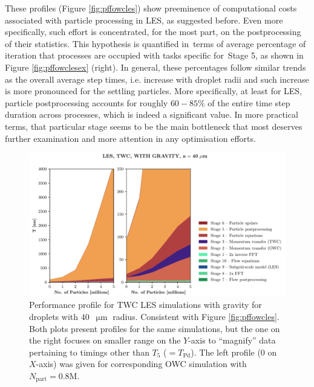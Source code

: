 \documentclass{pracamgren}
\begin{document}
These profiles (Figure \ref{fig:pffowcles}) show preeminence of computational costs associated with particle processing in LES, as suggested before.
Even more specifically, such effort is concentrated, for the most part, on the postprocessing of their statistics.
This hypothesis is quantified in~terms of average percentage of iteration that processes are occupied with tasks specific for~Stage 5, as shown in Figure \ref{fig:pffowclesex} (right).
In general, these percentages follow similar trends as the overall average step times, i.e. increase with droplet radii and such increase is more pronounced for the settling particles.
More specifically, at least for LES, particle postprocessing accounts for roughly $60-85 \%$ of the entire time step duration across processes,  which is indeed a significant value.
In more practical terms, that particular stage seems to be the main bottleneck that most deserves further examination and more attention in any optimisation efforts.  

\begin{figure}[h]
\centering
\includegraphics[width=13.5cm]{img/plots/3-3c-pfftwcles.pdf}
\caption{
Performance profile for TWC LES simulations with gravity for droplets with $40$~$\upmu\text{m}$ radius.
Consistent with Figure \ref{fig:pffowcles}.
Both plots present profiles for the same simulations, but the one on the right focuses on smaller range on the $Y$-axis to ``magnify'' data pertaining to timings other than $T_5$ ($ = T_{\text{Pd}}$).
The left profile ($0$ on $X$-axis) was given for corresponding OWC simulation with~$N_{\text{part}} = 0.8\text{M}$. 
}
\label{fig:pfftwcles}
\end{figure}
\end{document}
